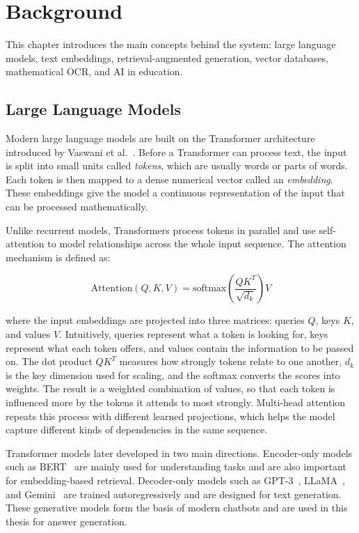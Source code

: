 \chapter{Background }
\label{Chap:background}

This chapter introduces the main concepts behind the system: large language
models, text embeddings, retrieval-augmented generation, vector databases,
mathematical OCR, and AI in education.

\section{Large Language Models}
\label{sec:llm-background}

Modern large language models are built on the Transformer architecture
introduced by Vaswani et al.~\cite{vaswani2017attention}. Before a
Transformer can process text, the input is split into small units called
\textit{tokens}, which are usually words or parts of words. Each token is
then mapped to a dense numerical vector called an \textit{embedding}. These
embeddings give the model a continuous representation of the input that can
be processed mathematically.

Unlike recurrent models, Transformers process tokens in parallel and use
self-attention to model relationships across the whole input sequence. The
attention mechanism is defined as:

\begin{equation}
\text{Attention}(Q, K, V) = \text{softmax}\left(\frac{QK^T}{\sqrt{d_k}}\right) V
\label{eq:attention}
\end{equation}

where the input embeddings are projected into three matrices: queries $Q$,
keys $K$, and values $V$. Intuitively, queries represent what a token is
looking for, keys represent what each token offers, and values contain the
information to be passed on. The dot product $QK^T$ measures how strongly
tokens relate to one another, $d_k$ is the key dimension used for scaling,
and the softmax converts the scores into weights. The result is a weighted
combination of values, so that each token is influenced more by the tokens
it attends to most strongly. Multi-head attention repeats this process with
different learned projections, which helps the model capture different kinds
of dependencies in the same sequence.

Transformer models later developed in two main directions. Encoder-only
models such as BERT~\cite{devlin2019bert} are mainly used for understanding
tasks and are also important for embedding-based retrieval. Decoder-only
models such as GPT-3~\cite{brown2020gpt3}, LLaMA~\cite{touvron2023llama},
and Gemini~\cite{team2023gemini} are trained autoregressively and are
designed for text generation. These generative models form the basis of
modern chatbots and are used in this thesis for answer generation.

